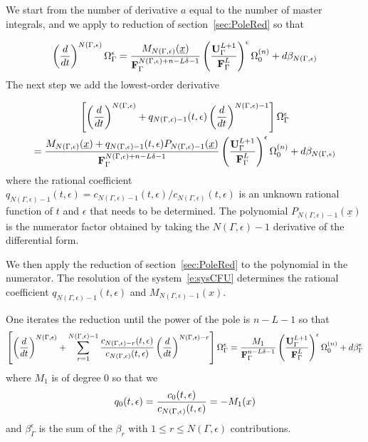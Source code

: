\documentclass[a4paper,12pt]{article}
\numberwithin{equation}{section}
\numberwithin{figure}{section}
\begin{document}
We start from the number of derivative $a$ equal to the
number of master integrals, and we apply to reduction of
section~\ref{sec:PoleRed} so that

\begin{equation}\label{e:step1}
\left(d\over dt\right)^{N(\Gamma,\epsilon)} \Omega_\Gamma^\epsilon= {M_{
      N(\Gamma,\epsilon)}(\underline x)\over
    \textbf{F}_\Gamma^{N(\Gamma,\epsilon)+n-L\delta-1}
  }\left(\textbf{U}_\Gamma^{L+1}\over \textbf{F}_\Gamma^L
  \right)^\epsilon \Omega_0^{(n)}+ d\beta_{N(\Gamma,\epsilon)}  
\end{equation}
%
The next step we add the lowest-order derivative

\begin{multline}\label{e:step2}
\left[\left(d\over dt\right)^{N(\Gamma,\epsilon)}
  +q_{N(\Gamma,\epsilon)-1}(t,\epsilon) \left(d\over dt\right)^{N(\Gamma,\epsilon)-1}\right] \Omega_\Gamma^\epsilon\cr= {M_{
      N(\Gamma,\epsilon)}(\underline x)+q_{N(\Gamma,\epsilon)-1}(t,\epsilon)
    P_{N(\Gamma,\epsilon)-1}(\underline x) \over
    \textbf{F}_\Gamma^{N(\Gamma,\epsilon)+n-L\delta-1}
  }\left(\textbf{U}_\Gamma^{L+1}\over \textbf{F}_\Gamma^L
  \right)^\epsilon \Omega_0^{(n)}+ d\beta_{N(\Gamma,\epsilon)}  
\end{multline}
where the rational coefficient
$q_{N(\Gamma,\epsilon)-1}(t,\epsilon)=c_{N(\Gamma,\epsilon)-1}(t,\epsilon)/c_{N(\Gamma,\epsilon)}(t,\epsilon)$
is an unknown rational function of $t$ and $\epsilon$ that needs to be
determined. The polynomial $ P_{N(\Gamma,\epsilon)-1}(\underline x) $
is the numerator factor obtained by taking the $N(\Gamma,\epsilon)-1$
derivative of the differential form.

We then apply the reduction of section~\ref{sec:PoleRed} to
the polynomial in the numerator. The resolution of the
system~\eqref{e:sysCFU} determines the  rational coefficient
$q_{N(\Gamma,\epsilon)-1}(t,\epsilon)$ and
$M_{N(\Gamma,\epsilon)-1}(x)$.

One iterates the reduction until the power of the pole is $n-L-1$ so
that
\begin{equation}\label{e:stepfinal}
\left[\left(d\over dt\right)^{N(\Gamma,\epsilon)}
  +\sum_{r=1}^{N(\Gamma,\epsilon)-1}
  {c_{N(\Gamma,\epsilon)-r}(t,\epsilon)\over c_{N(\Gamma,\epsilon)}(t,\epsilon)} \left(d\over dt\right)^{N(\Gamma,\epsilon)-r}\right] \Omega_\Gamma^\epsilon= {M_{1}\over
    \textbf{F}_\Gamma^{n-L\delta-1}
  }\left(\textbf{U}_\Gamma^{L+1}\over \textbf{F}_\Gamma^L
  \right)^\epsilon \Omega_0^{(n)}+ d\beta_\Gamma^\epsilon 
\end{equation}
where $M_1$ is of degree 0 so that we
\begin{equation}
  q_0(t,\epsilon)=  {c_{0}(t,\epsilon)\over c_{N(\Gamma,\epsilon)}(t,\epsilon)}= -M_1(x)  
\end{equation}
and $\beta_\Gamma^\epsilon $ is the sum of the $\beta_r$ with $1\leq
r\leq N(\Gamma,\epsilon)$
contributions.
\end{document}
